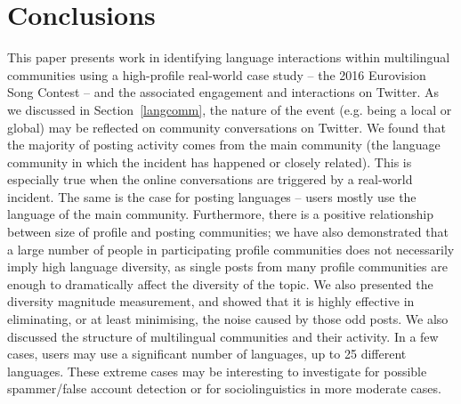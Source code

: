 \documentclass{llncs}
\begin{document}

\section{Conclusions}\label{conclusions}

This paper presents work in identifying language interactions within
multilingual communities using a high-profile real-world case study --
the 2016 Eurovision Song Contest -- and the associated engagement and
interactions on Twitter. As we discussed in Section~\ref{langcomm},
the nature of the event (e.g. being a local or global) may be
reflected on community conversations on Twitter. We found that the
majority of posting activity comes from the main community (the
language community in which the incident has happened or closely
related). This is especially true when the online conversations are
triggered by a real-world incident. The same is the case for posting
languages -- users mostly use the language of the main
community. Furthermore, there is a positive relationship between size
of profile and posting communities; we have also demonstrated that a
large number of people in participating profile communities does not
necessarily imply high language diversity, as single posts from many
profile communities are enough to dramatically affect the diversity of
the topic. We also presented the diversity magnitude measurement, and
showed that it is highly effective in eliminating, or at least
minimising, the noise caused by those odd posts.  We also discussed
the structure of multilingual communities and their activity.  In a
few cases, users may use a significant number of languages, up to 25
different languages. These extreme cases may be interesting to
investigate for possible spammer/false account detection or for
sociolinguistics in more moderate cases.
\end{document}

